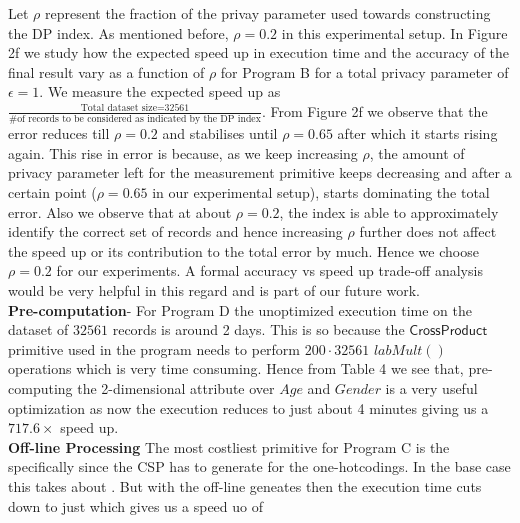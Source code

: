 Let $\rho$ represent the fraction of the privay parameter used towards constructing the DP index. As mentioned before, $\rho=0.2$ in this experimental setup.  In Figure 2f we study how the expected speed up in execution time and the accuracy of the final result vary as a function of $\rho$ for Program B for a total privacy parameter of $\epsilon=1$. We measure the expected speed up as $\frac{\text{Total dataset size=32561}}{\text{\# of records to be considered as indicated by the DP index}}$. From Figure 2f we observe that the error reduces till $\rho=0.2$ and stabilises until $\rho=0.65$ after which it starts rising again. This rise in error is because, as we keep increasing $\rho$, the amount of privacy parameter left for the measurement primitive keeps decreasing and after a certain point ($\rho=0.65$ in our experimental setup), starts dominating the total error. Also we observe that at about $\rho=0.2$, the index is able to approximately identify the correct set of records and hence increasing $\rho$ further does not affect the speed up or its contribution to the total error by much. Hence we choose $\rho=0.2$ for our experiments. A formal accuracy vs speed up trade-off analysis would be very helpful in this regard and is part of our future work.
 \\\textbf{Pre-computation}- For Program D the unoptimized execution time on the dataset of $32561$ records is around 2 days. This is so because the $\textsf{CrossProduct}$ primitive used in the program needs to perform $200\cdot 32561$ $labMult()$ operations which is very time consuming. Hence from Table 4 we see that, pre-computing the 2-dimensional attribute over $Age$ and $Gender$ is a very useful optimization as now the execution reduces to just about 4 minutes giving us a $717.6\times$ speed up. \\ %
\textbf{Off-line Processing}
The most costliest primitive for Program C is the specifically since the \textsf{CSP} has to generate for the one-hotcodings. In the base case this takes about . But with the off-line geneates then the execution time cuts down to just which gives us a speed uo of 
